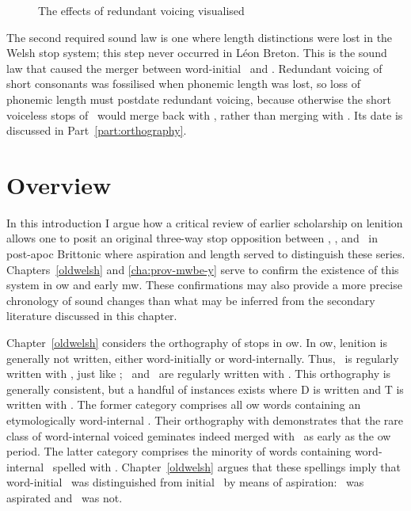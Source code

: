 \begin{figure}[h]
  \centering
  \caption{The effects of redundant voicing  visualised}
  \label{fig:redvoicvis}
\end{figure}

The second required sound law is one where length distinctions were lost in the Welsh stop system; this step never occurred in Léon Breton. This is the sound law that caused the merger between word-initial \xD\ and \lT. Redundant voicing of short consonants was fossilised when phonemic length was lost, so loss of phonemic length must postdate redundant voicing, because otherwise the short voiceless stops of \lT\ would merge back with \xT, rather than merging with \xD. Its date is discussed in Part~\ref{part:orthography}.


\section{Overview}
\label{sec:overview-1}

In this introduction I argue how a critical review of earlier scholarship on lenition allows one to posit an original three-way stop opposition between \xT, \xD, and \lT\ in post-\gls{apoc} Brittonic where aspiration and length served to distinguish these series. Chapters~\ref{oldwelsh} and \ref{cha:prov-mwbe-y} serve to confirm the existence of this system in \gls{ow} and early \gls{mw}. These confirmations may also provide a more precise chronology of sound changes than what may be inferred from the secondary literature discussed in this chapter.

Chapter~\ref{oldwelsh} considers the orthography of stops in \gls{ow}. In \gls{ow}, lenition is generally not written, either word-initially or word-internally. Thus, \lT\ is regularly written with , just like \xT; \lD\ and \xD\ are regularly written with . This orthography is generally consistent, but a handful of instances exists where \gls{D} is written  and \gls{T} is written with . The former category comprises all \gls{ow} words containing an etymologically word-internal \xD. Their orthography with  demonstrates that the rare class of word-internal voiced geminates indeed merged with \lT\ as early as the \gls{ow} period. The latter category comprises the minority of words containing word-internal \lT\ spelled with . Chapter~\ref{oldwelsh} argues that these spellings imply that word-initial \lT\ was distinguished from initial \xD\ by means of aspiration: \lT\ was aspirated and \xD\ was not.

